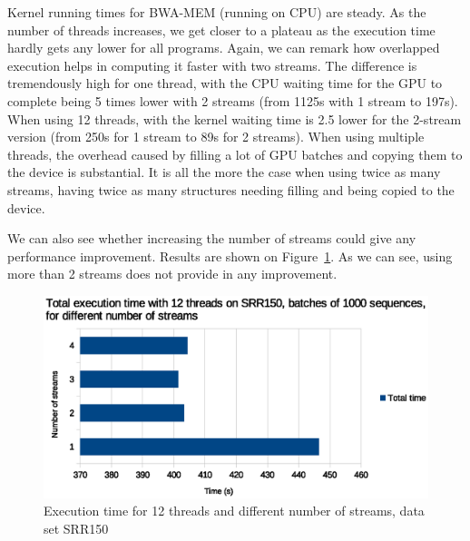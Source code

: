 Kernel running times for BWA-MEM (running on CPU) are steady. As the number of threads increases, we get closer to a plateau as the execution time hardly gets any lower for all programs. Again, we can remark how overlapped execution helps in computing it faster with two streams. The difference is tremendously high for one thread, with the CPU waiting time for the GPU to complete being 5 times lower with 2 streams (from 1125s with 1 stream to 197s). When using 12 threads, with the kernel waiting time is  2.5 lower for the 2-stream version (from 250s for 1 stream to 89s for 2 streams). When using multiple threads, the overhead caused by filling a lot of GPU batches and copying them to the device is substantial. It is all the more the case when using twice as many streams, having twice as many structures needing filling and being copied to the device.

We can also see whether increasing the number of streams could give any performance improvement. Results are shown on Figure~\ref{fig:exec-time-nbstreams}. As we can see, using more than 2 streams does not provide in any improvement. 

\begin{figure}[h]
	\centering
	\includegraphics[width=0.9\linewidth]{exec-time-nbstreams}
	\caption{Execution time for 12 threads and different number of streams, data set SRR150}
	\label{fig:exec-time-nbstreams}
\end{figure}

